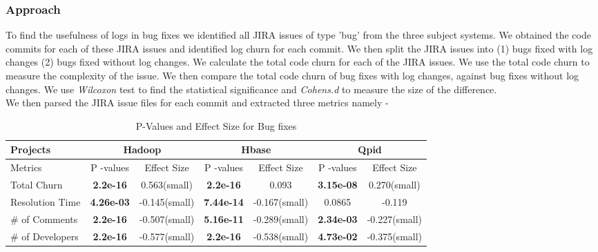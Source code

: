 \subsubsection*{\textbf{Approach}}

To find the usefulness of logs in bug fixes we identified all JIRA issues of type 'bug' from the three subject systems. We obtained the code commits for each of these JIRA issues and identified log churn for each commit. We then split the JIRA issues into (1) bugs fixed with log changes (2) bugs fixed without log changes. We calculate the total code churn for each of the JIRA issues. We use the total code churn to measure the complexity of the issue. We then compare the total code churn of bug fixes with log changes, against bug fixes without log changes. We use \textsl{Wilcoxon} test to find the statistical significance and \textsl{Cohens.d} to measure the size of the difference. \\


We then parsed the JIRA issue files for each commit and extracted three metrics namely -

\begin{table}[t]
\protect\caption{P-Values and Effect Size for Bug fixes}


\hphantom{}

\centering{}%
\begin{tabular}{|>{\centering}m{4.1cm}|c|c|c|c|c|c|}
\hline 
Projects & \multicolumn{2}{c|}{Hadoop} & \multicolumn{2}{c|}{Hbase} & \multicolumn{2}{c|}{Qpid}\tabularnewline
\hline 
Metrics & P -values  & Effect Size & P -values  & Effect Size & P -values  & Effect Size\tabularnewline
\hline 
Total Churn & \textbf{2.2e-16} & 0.563(small) & \textbf{2.2e-16} & 0.093 & \textbf{3.15e-08} & 0.270(small)\tabularnewline
\hline 
Resolution Time & \textbf{4.26e-03} & -0.145(small) & \textbf{7.44e-14} & -0.167(small) & 0.0865 & -0.119\tabularnewline
\hline 
\# of Comments & \textbf{2.2e-16} & -0.507(small) & \textbf{5.16e-11} & -0.289(small) & \textbf{2.34e-03} & -0.227(small)\tabularnewline
\hline 
\# of  Developers & \textbf{2.2e-16} & -0.577(small) & \textbf{2.2e-16} & -0.538(small) & \textbf{4.73e-02} & -0.375(small)\tabularnewline
\hline 
\end{tabular}
\end{table}

